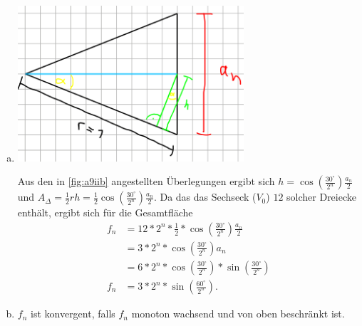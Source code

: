 \documentclass[12pt,a4paper]{article}
\begin{document}
\begin{enumerate}[(i)]
\begin{enumerate}[(a)]
        \item \begin{minipage}{\linewidth}
            \centering
            \includegraphics[width=0.66\textwidth]{triangle.png}
            \label{fig:a9iib}
        \end{minipage}

        Aus den in \autoref{fig:a9iib} angestellten Überlegungen ergibt sich
        $h = \cos \left(\frac{30^{\circ}}{2^n}\right) \frac{a_n}{2}$
        und
        $A_{\Delta} = \frac{1}{2}rh = \frac{1}{2}\cos\left(\frac{30^{\circ}}{2^n}\right) \frac{a_n}{2}$.
        Da das das Sechseck ($V_0$) $12$ solcher Dreiecke enthält, ergibt sich für die Gesamtfläche
        \begin{align*}
            f_n &= 12 * 2^n * \frac{1}{2} * \cos\left(\frac{30^{\circ}}{2^n}\right) \frac{a_n}{2}\\
            &= 3 * 2^n * \cos\left(\frac{30^{\circ}}{2^n}\right) a_n\\
            &= 6 * 2^n * \cos\left(\frac{30^{\circ}}{2^n}\right) * \sin\left(\frac{30^{\circ}}{2^n}\right)\\
            f_n &= 3 * 2^n * \sin\left(\frac{60^{\circ}}{2^n}\right).
        \end{align*}


        \item $f_n$ ist konvergent, falls $f_n$ monoton wachsend und von oben beschränkt ist.\\


\end{enumerate}
\end{enumerate}
\end{document}
